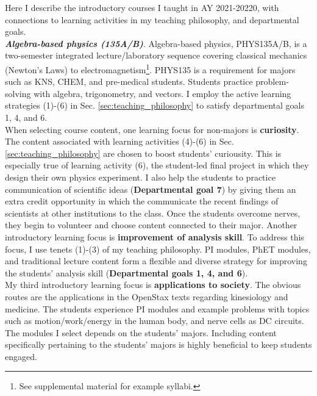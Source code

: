 \documentclass[../../../main.tex]{subfiles}
\begin{document}
\label{sec:intro_course_desc}

Here I describe the introductory courses I taught in AY 2021-20220, with connections to learning activities in my teaching philosophy, and departmental goals.
\\
\vspace{0.25cm}
\textbf{\textit{Algebra-based physics (135A/B)}}. Algebra-based physics, PHYS135A/B, is a two-semester integrated lecture/laboratory sequence covering classical mechanics (Newton's Laws) to electromagnetism\footnote{See supplemental material for example syllabi.}.  PHYS135 is a requirement for majors such as KNS, CHEM, and pre-medical students.  Students practice problem-solving with algebra, trigonometry, and vectors.  I employ the active learning strategies (1)-(6) in Sec. \ref{sec:teaching_philosophy} to satisfy departmental goals 1, 4, and 6.
\\
\vspace{0.25cm}
When selecting course content, one learning focus for non-majors is \textbf{curiosity}.  The content associated with learning activities (4)-(6) in Sec. \ref{sec:teaching_philosophy} are chosen to boost students' curiousity.  This is especially true of learning activity (6), the student-led final project in which they design their own physics experiment.  I also help the students to practice communication of scientific ideas (\textbf{Departmental goal 7}) by giving them an extra credit opportunity in which the communicate the recent findings of scientists at other institutions to the class.  Once the students overcome nerves, they begin to volunteer and choose content connected to their major.  Another introductory learning focus is \textbf{improvement of analysis skill}.  To address this focus, I use tenets (1)-(3) of my teaching philosophy.  PI modules, PhET modules, and traditional lecture content form a flexible and diverse strategy for improving the students' analysis skill (\textbf{Departmental goals 1, 4, and 6}).
\\
\vspace{0.25cm}
My third introductory learning focus is \textbf{applications to society}.  The obvious routes are the applications in the OpenStax texts \cite{openstax1} regarding kinesiology and medicine.  The students experience PI modules and example problems with topics such as motion/work/energy in the human body, and nerve cells as DC circuits.  The modules I select depends on the students' majors.  Including content specifically pertaining to the students' majors is highly beneficial to keep students engaged.
\end{document}
